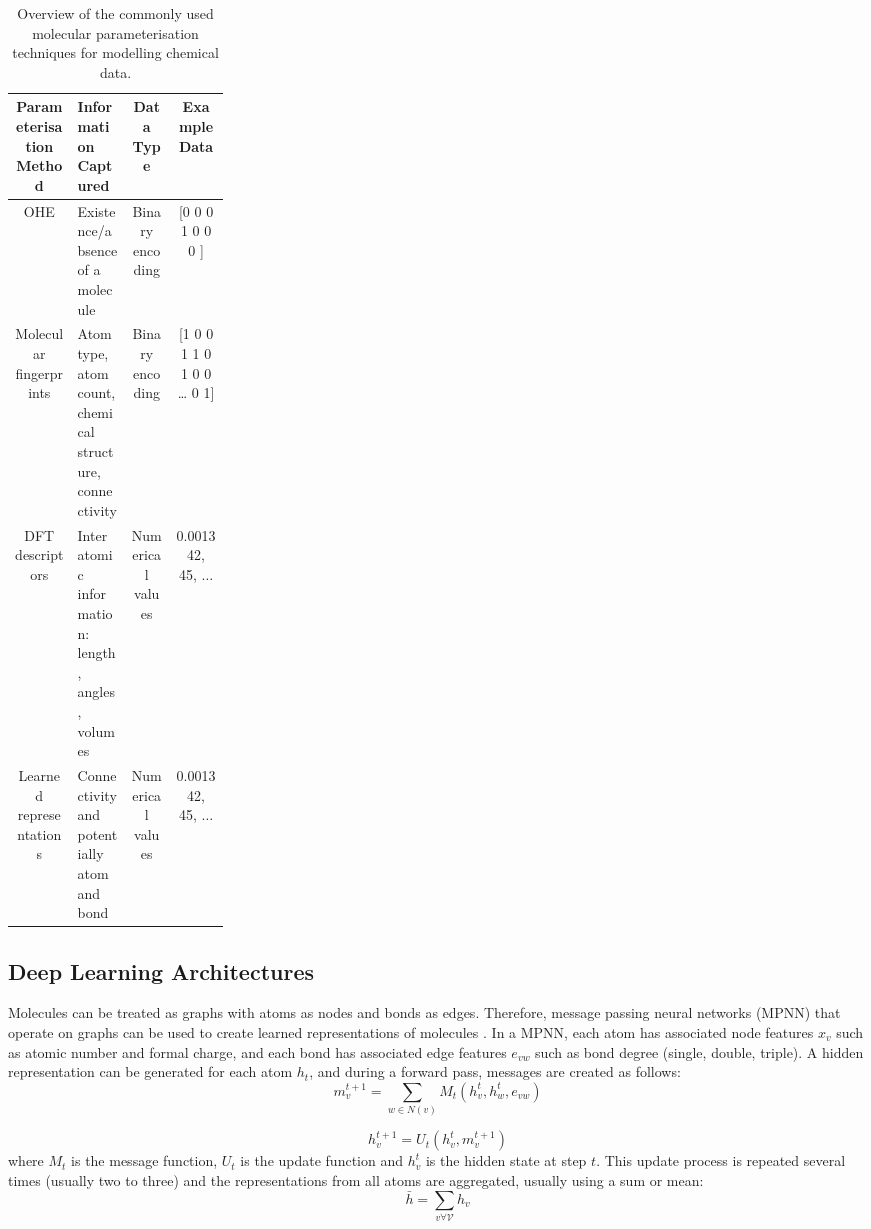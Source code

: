 \begin{sidewaystable}
    \caption{Overview of the commonly used molecular parameterisation techniques for modelling chemical data.}
    \begin{tabular}{cp{0.25\linewidth}cc}
         Parameterisation
    Method & Information Captured & Data Type & Example Data  \\
        \hline
         OHE & Existence/absence of a molecule & Binary encoding & [0 0 0 1 0 0 0 ] \\
         Molecular fingerprints & Atom type, atom count, chemical structure, connectivity & Binary encoding & [1 0 0 1 1 0 1 0 0 … 0 1] \\
         DFT descriptors & Inter atomic information: length, angles, volumes &  Numerical values & 0.001342, 45, $\dots$ \\
         Learned representations & Connectivity and potentially atom and bond & Numerical values & 0.001342, 45, $\dots$
    \end{tabular}
    \label{tab:parameterization}
\end{sidewaystable}

\subsection{Deep Learning Architectures}

Molecules can be treated as graphs with atoms as nodes and bonds as edges. Therefore, message passing neural networks (MPNN) that operate on graphs can be used to create learned representations of molecules \cite{Gilmer2017}.  In a MPNN, each atom has associated node features $x_v$ such as atomic number and formal charge, and each bond has associated edge features $e_{vw}$ such as bond degree (single, double, triple). A hidden representation can be generated for each atom $h_t$, and  during a forward pass, messages are created as follows:
\begin{equation}
    m_v^{t+1} = \sum_{w\in N(v)} M_t(h_v^t, h_w^t, e_{vw})
\end{equation}

\begin{equation}
    h_v^{t+1} = U_t(h_v^t, m_v^{t+1})
\end{equation}
where $M_t$ is the message function, $U_t$ is the update function and $h_v^{t}$ is the hidden state at step $t$. This update process is repeated several times (usually two to three) and the representations from all atoms are aggregated, usually using a sum or mean:
\begin{equation}
    \bar h = \sum_{v\forall \mathcal V} h_v
\end{equation}


